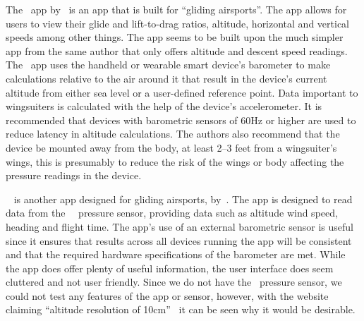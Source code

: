 \documentclass[11pt, twocolumn]{article}
\begin{document}
The~ app by~\textcite{pfm_technologies_llc_l/d_2015} is an app that is built for ``gliding airsports''. The app allows for users to view their glide and lift-to-drag ratios, altitude, horizontal and vertical speeds among other things. The app seems to be built upon the much simpler~ app from the same author that only offers altitude and descent speed readings.
The~ app uses the handheld or wearable smart device's barometer to make calculations relative to the air around it that result in the device's current altitude from either sea level or a user-defined reference point. Data important to wingsuiters is calculated with the help of the device's accelerometer. It is recommended that devices with barometric sensors of 60Hz or higher are used to reduce latency in altitude calculations. The authors also recommend that the device be mounted away from the body, at least 2--3 feet from a wingsuiter's wings, this is presumably to reduce the risk of the wings or body affecting the pressure readings in the device.

~ is another app designed for gliding airsports, by~\textcite{dickie_blueflyvario_2016}. The app is designed to read data from the~~\cite{noauthor_blueflyvario_nodate} pressure sensor, providing data such as altitude wind speed, heading and flight time.
The app's use of an external barometric sensor is useful since it ensures that results across all devices running the app will be consistent and that the required hardware specifications of the barometer are met.
While the app does offer plenty of useful information, the user interface does seem cluttered and not user friendly. Since we do not have the~ pressure sensor, we could not test any features of the app or sensor, however, with the website claiming ``altitude resolution of 10cm''~\cite{noauthor_blueflyvario_nodate} it can be seen why it would be desirable.
\end{document}
